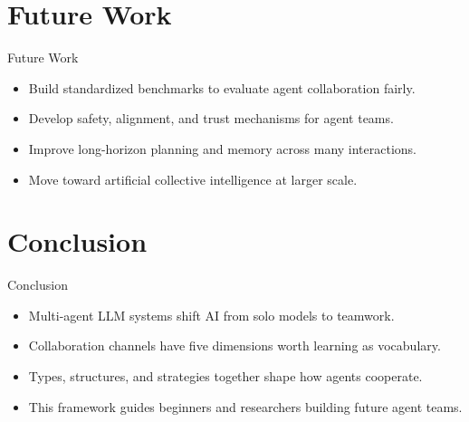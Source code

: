 \documentclass[10pt]{beamer}
\begin{document}
\section{Future Work}
\begin{frame}{Future Work}
\begin{itemize}
  \item Build standardized benchmarks to evaluate agent collaboration fairly.
  \item Develop safety, alignment, and trust mechanisms for agent teams.
  \item Improve long-horizon planning and memory across many interactions.
  \item Move toward artificial collective intelligence at larger scale.
\end{itemize}
\end{frame}
\section{Conclusion}
\begin{frame}{Conclusion}
\begin{itemize}
  \item Multi-agent LLM systems shift AI from solo models to teamwork.
  \item Collaboration channels have five dimensions worth learning as vocabulary.
  \item Types, structures, and strategies together shape how agents cooperate.
  \item This framework guides beginners and researchers building future agent teams.
\end{itemize}
\end{frame}
\end{document}
